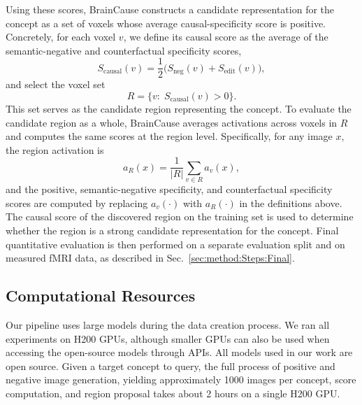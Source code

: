 \documentclass{llmxive}
\begin{document}
Using these scores, BrainCause constructs a candidate representation for the concept as a set of voxels whose average causal-specificity score is positive. Concretely, for each voxel \(v\), we define its causal score as the average of the semantic-negative and counterfactual specificity scores,
\[
S_{\mathrm{causal}}(v)=\frac{1}{2}\Big(S_{\mathrm{neg}}(v)+S_{\mathrm{edit}}(v)\Big),
\]
and select the voxel set
\[
R=\{v:\; S_{\mathrm{causal}}(v)>0\}.
\]
This set serves as the candidate region representing the concept. To evaluate the candidate region as a whole, BrainCause averages activations across voxels in \(R\) and computes the same scores at the region level. Specifically, for any image \(x\), the region activation is
\[
a_R(x)=\frac{1}{|R|}\sum_{v\in R} a_v(x),
\]
and the positive, semantic-negative specificity, and counterfactual specificity scores are computed by replacing \(a_v(\cdot)\) with \(a_R(\cdot)\) in the definitions above. The causal score of the discovered region on the training set is used to determine whether the region is a strong candidate representation for the concept. Final quantitative evaluation is then performed on a separate evaluation split and on measured fMRI data, as described in Sec.~\ref{sec:method:Steps:Final}.



\subsection{Computational Resources}
\label{sec_sup:resources}

Our pipeline uses large models during the data creation process. We ran all experiments on H200 GPUs, although smaller GPUs can also be used when accessing the open-source models through APIs. All models used in our work are open source. Given a target concept to query, the full process of positive and negative image generation, yielding approximately 1000 images per concept, score computation, and region proposal takes about 2 hours on a single H200 GPU.




% 
% 
\end{document}
